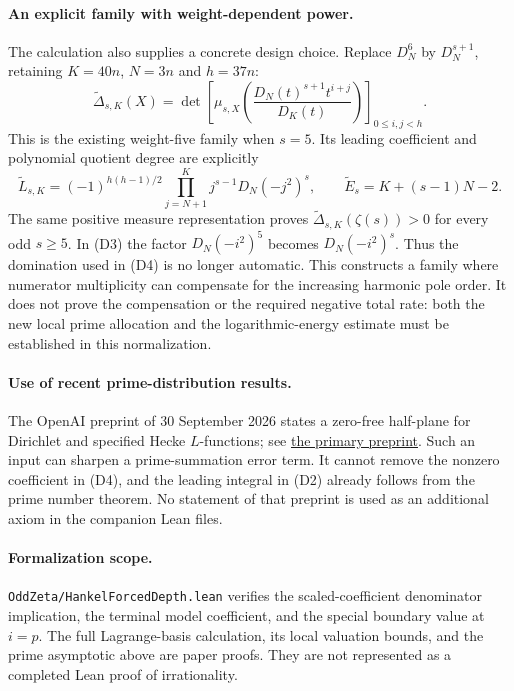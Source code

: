 \paragraph{An explicit family with weight-dependent power.}
The calculation also supplies a concrete design choice. Replace
$D_N^6$ by $D_N^{s+1}$, retaining $K=40n$, $N=3n$ and $h=37n$:
\[
 \widetilde\Delta_{s,K}(X)=\det\left[
 \mu_{s,X}\left(\frac{D_N(t)^{s+1}t^{i+j}}{D_K(t)}\right)
 \right]_{0\le i,j<h}.
\]
This is the existing weight-five family when $s=5$. Its leading
coefficient and polynomial quotient degree are explicitly
\[
 \widetilde L_{s,K}=(-1)^{h(h-1)/2}
 \prod_{j=N+1}^K j^{s-1}D_N(-j^2)^s,
 \qquad \widetilde E_s=K+(s-1)N-2.
\]
The same positive measure representation proves
$\widetilde\Delta_{s,K}(\zeta(s))>0$ for every odd $s\ge5$.
In (D3) the factor $D_N(-i^2)^5$ becomes $D_N(-i^2)^s$.
Thus the domination used in (D4) is no longer automatic. This
constructs a family where numerator multiplicity can compensate
for the increasing harmonic pole order. It does not prove the
compensation or the required negative total rate: both the new
local prime allocation and the logarithmic-energy estimate must
be established in this normalization.

\paragraph{Use of recent prime-distribution results.}
The OpenAI preprint of 30 September 2026 states a zero-free half-plane
for Dirichlet and specified Hecke $L$-functions; see
\href{https://github.com/openai/math/blob/main/preprints/The-Quasi-Riemann-Hypothesis-September-30-2026/paper.pdf}
{the primary preprint}. Such an input can sharpen a prime-summation
error term. It cannot remove the nonzero coefficient in (D4), and
the leading integral in (D2) already follows from the prime number
theorem. No statement of that preprint is used as an additional
axiom in the companion Lean files.

\paragraph{Formalization scope.}
\texttt{OddZeta/HankelForcedDepth.lean} verifies the scaled-coefficient
denominator implication, the terminal model coefficient, and the
special boundary value at $i=p$. The full Lagrange-basis calculation,
its local valuation bounds, and the prime asymptotic above are paper
proofs. They are not represented as a completed Lean proof of
irrationality.
